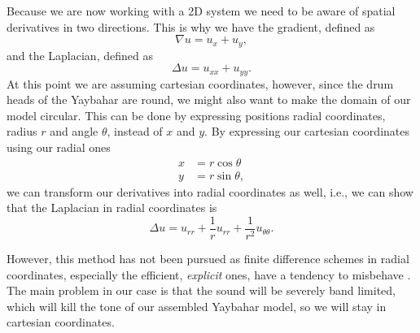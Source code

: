 \documentclass{article}
\begin{document}
Because we are now working with a 2D system we need to be aware of spatial derivatives in two directions.
This is why we have the gradient, defined as
\begin{equation}
  \nabla u = u_x + u_y,
\end{equation}
and the Laplacian, defined as
\begin{equation}
  \Delta u = u_{xx} + u_{yy}.
\end{equation}
At this point we are assuming cartesian coordinates, however, since the drum heads of the Yaybahar are round, we might also want to make the domain of our model circular.
This can be done by expressing positions radial coordinates, radius $r$ and angle $\theta$, instead of $x$ and $y$.
By expressing our cartesian coordinates using our radial ones
\begin{align}
  x &= r \cos \theta\\
  y &= r \sin \theta,
\end{align}
we can transform our derivatives into radial coordinates as well, i.e., we can show that the Laplacian in radial coordinates is
\begin{equation}
  \Delta u = u_{rr} + \frac{1}{r} u_{rr} + \frac{1}{r^2} u_{\theta \theta}.
\end{equation}

However, this method has not been pursued as finite difference schemes in radial coordinates, especially the efficient, \textit{explicit} ones, have a tendency to misbehave \cite[Chapter~12]{bilbao_numerical_2009}.
The main problem in our case is that the sound will be severely band limited, which will kill the tone of our assembled Yaybahar model, so we will stay in cartesian coordinates.
\end{document}
